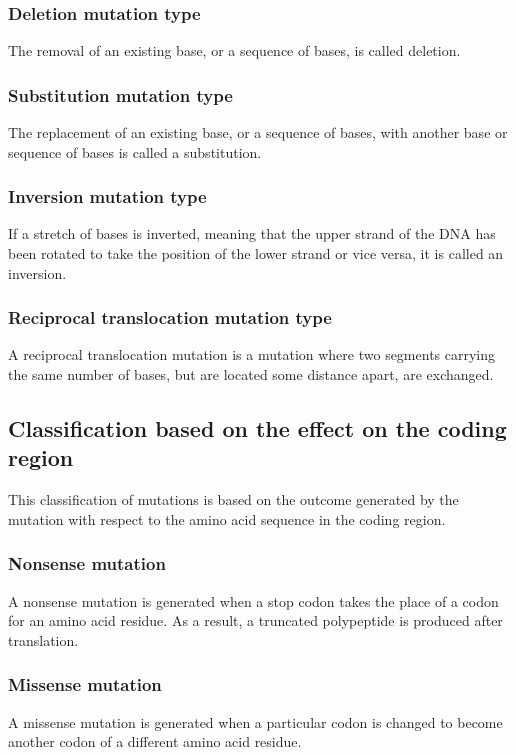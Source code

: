 \documentclass[11pt]{article}
\begin{document}
\subsubsection{Deletion mutation type}
\label{sec:org90369ec}
The removal of an existing base, or a sequence of bases, is called deletion.

\subsubsection{Substitution mutation type}
\label{sec:org0d7e243}
The replacement of an existing base, or a sequence of bases, with another base or sequence of bases is called a substitution.

\subsubsection{Inversion mutation type}
\label{sec:org953d42b}
If a stretch of bases is inverted, meaning that the upper strand of the DNA has been rotated to take the position of the lower strand or vice versa, it is called an inversion.

\subsubsection{Reciprocal translocation mutation type}
\label{sec:org74dd68c}
A reciprocal translocation mutation is a mutation where two segments carrying the same number of bases, but are located some distance apart, are exchanged.

\newpage

\subsection{Classification based on the effect on the coding region}
\label{sec:org4bf532b}
This classification of mutations is based on the outcome generated by the mutation with respect to the amino acid sequence in the coding region.

\subsubsection{Nonsense mutation}
\label{sec:org75f80bd}
A nonsense mutation is generated when a stop codon takes the place of a codon for an amino acid residue. As a result, a truncated polypeptide is produced after translation.

\subsubsection{Missense mutation}
\label{sec:orge5f2873}
A missense mutation is generated when a particular codon is changed to become another codon of a different amino acid residue.
\end{document}
